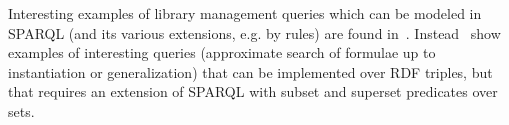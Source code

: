 
Interesting examples of library management queries which can be modeled in SPARQL (and its various extensions, e.g. by rules) are found in~\cite{conf/lpar/AspinallDL12}. Instead~\cite{AGSTZ:ContMathSearchWhelp04,MKM04:AspertiS04} show examples of interesting queries (approximate search of formulae up to instantiation or generalization) that can be implemented over RDF triples, but that requires an extension of SPARQL with subset and superset predicates over sets.
%
%
